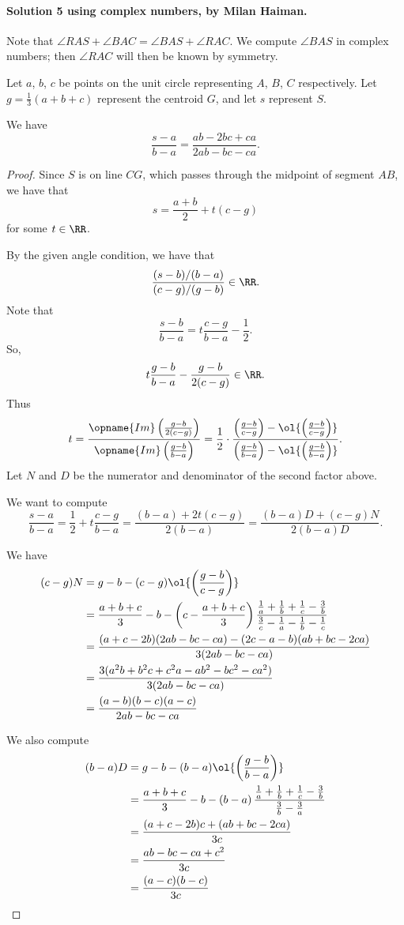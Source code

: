\paragraph{Solution 5 using complex numbers, by Milan Haiman.}
Note that $\angle RAS + \angle BAC=\angle BAS+\angle RAC$.
We compute $\angle BAS$ in complex numbers;
then $\angle RAC$ will then be known by symmetry.

Let $a$, $b$, $c$ be points on the unit circle representing $A$, $B$, $C$ respectively.
Let $g=\frac{1}{3}(a+b+c)$ represent the centroid $G$,
and let $s$ represent $S$.

\begin{claim*}
  We have
  \[ \frac{s-a}{b-a} = \frac{ab-2bc+ca}{2ab-bc-ca}. \]
\end{claim*}
\begin{proof}
Since $S$ is on line $CG$, which passes through the midpoint of segment $AB$, we
have that \[ s=\frac{a+b}{2}+t(c-g) \] for some $t\in\RR$.

By the given angle condition, we have that
\[ \frac{(s-b)/(b-a)}{(c-g)/(g-b)}\in\RR. \]
Note that \[ \frac{s-b}{b-a}=t\frac{c-g}{b-a}-\frac{1}{2}. \]
So, \[ t\frac{g-b}{b-a}-\frac{g-b}{2(c-g)}\in \RR. \]
Thus
\[
  t = \frac{\opname{Im} \left(\frac{g-b}{2(c-g)}\right)}
  {\opname{Im} \left(\frac{g-b}{b-a}\right)}
  = \frac{1}{2} \cdot \frac
    {\left(\frac{g-b}{c-g}\right)-\ol{\left(\frac{g-b}{c-g}\right)}}
    {\left(\frac{g-b}{b-a}\right)-\ol{\left(\frac{g-b}{b-a}\right)}}.
\]
Let $N$ and $D$ be the numerator and denominator of the second factor above.

We want to compute
\[ \frac{s-a}{b-a}
   = \frac{1}{2}+t\frac{c-g}{b-a}
   = \frac{(b-a)+2t(c-g)}{2(b-a)}
   = \frac{(b-a)D+(c-g)N}{2(b-a)D}. \]

We have
\begin{align*}
    (c-g)N &= g-b-(c-g)\ol{\left(\frac{g-b}{c-g}\right)} \\
    &= \frac{a+b+c}{3}-b-\left(c-\frac{a+b+c}{3}\right)\frac{\frac{1}{a}+\frac{1}{b}+\frac{1}{c}-\frac{3}{b}}{\frac{3}{c}-\frac{1}{a}-\frac{1}{b}-\frac{1}{c}}\\
    &= \frac{(a+c-2b)(2ab-bc-ca)-(2c-a-b)(ab+bc-2ca)}{3(2ab-bc-ca)}\\
    &= \frac{3(a^2b+b^2c+c^2a-ab^2-bc^2-ca^2)}{3(2ab-bc-ca)}\\
    &= \frac{(a-b)(b-c)(a-c)}{2ab-bc-ca}
\end{align*}

We also compute \begin{align*}
    (b-a)D&=g-b-(b-a)\ol{\left(\frac{g-b}{b-a}\right)} \\
    &=\frac{a+b+c}{3}-b-\left(b-a\right)\frac{\frac{1}{a}+\frac{1}{b}+\frac{1}{c}-\frac{3}{b}}{\frac{3}{b}-\frac{3}{a}}\\
    &=\frac{(a+c-2b)c+(ab+bc-2ca)}{3c}\\
    &=\frac{ab-bc-ca+c^2}{3c}\\
    &=\frac{(a-c)(b-c)}{3c}
\end{align*}


\end{proof}

